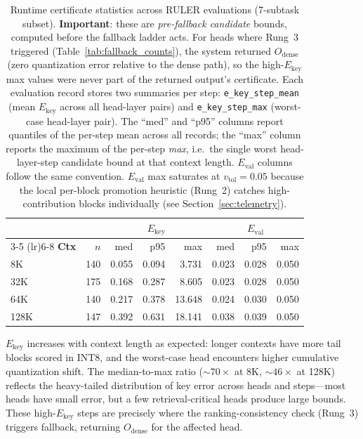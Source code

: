 \documentclass[10pt,twocolumn,a4paper]{article}
\theoremstyle{definition}
\theoremstyle{remark}
\begin{document}
\begin{table}[!t]
\centering
\caption{Runtime certificate statistics across RULER evaluations (7-subtask subset).  \textbf{Important}: these are \emph{pre-fallback candidate} bounds, computed before the fallback ladder acts.  For heads where Rung~3 triggered (Table~\ref{tab:fallback_counts}), the system returned $O_{\mathrm{dense}}$ (zero quantization error relative to the dense path), so the high-$E_{\mathrm{key}}$ max values were never part of the returned output's certificate.  Each evaluation record stores two summaries per step: \texttt{e\_key\_step\_mean} (mean $E_{\mathrm{key}}$ across all head-layer pairs) and \texttt{e\_key\_step\_max} (worst-case head-layer pair).  The ``med'' and ``p95'' columns report quantiles of the per-step mean across all records; the ``max'' column reports the maximum of the per-step \emph{max}, i.e.\ the single worst head-layer-step candidate bound at that context length.  $E_{\mathrm{val}}$ columns follow the same convention.  $E_{\mathrm{val}}$ max saturates at $v_{\mathrm{tol}}{=}0.05$ because the local per-block promotion heuristic (Rung~2) catches high-contribution blocks individually (see Section~\ref{sec:telemetry}).}
\label{tab:telemetry}
\small
\begin{tabular}{lrrrrrrr}
\toprule
& & \multicolumn{3}{c}{\textbf{$E_{\mathrm{key}}$}} & \multicolumn{3}{c}{\textbf{$E_{\mathrm{val}}$}} \\
\cmidrule(lr){3-5} \cmidrule(lr){6-8}
\textbf{Ctx} & $n$ & med & p95 & max & med & p95 & max \\
\midrule
8K   & 140 & 0.055 & 0.094 & 3.731 & 0.023 & 0.028 & 0.050 \\
32K  & 175 & 0.168 & 0.287 & 8.605 & 0.023 & 0.028 & 0.050 \\
64K  & 140 & 0.217 & 0.378 & 13.648 & 0.024 & 0.030 & 0.050 \\
128K & 147 & 0.392 & 0.631 & 18.141 & 0.038 & 0.039 & 0.050 \\
\bottomrule
\end{tabular}
\end{table}

$E_{\mathrm{key}}$ increases with context length as expected: longer contexts have more tail blocks scored in INT8, and the worst-case head encounters higher cumulative quantization shift.  The median-to-max ratio (${\sim}70\times$ at 8K, ${\sim}46\times$ at 128K) reflects the heavy-tailed distribution of key error across heads and steps---most heads have small error, but a few retrieval-critical heads produce large bounds.  These high-$E_{\mathrm{key}}$ steps are precisely where the ranking-consistency check (Rung~3) triggers fallback, returning $O_{\mathrm{dense}}$ for the affected head.
\end{document}
